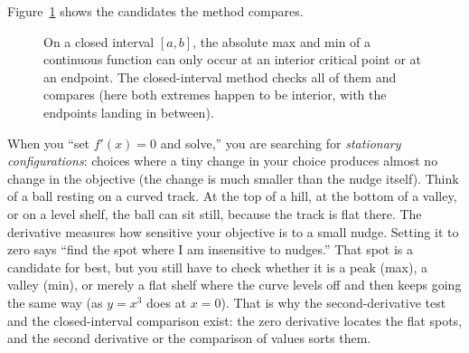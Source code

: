 Figure~\ref{ch17:fig-closed-interval} shows the candidates the method compares.

\begin{figure}[H]
\centering
{}
\caption{On a closed interval $[a,b]$, the absolute max and min of a continuous
function can only occur at an interior critical point or at an endpoint. The
closed-interval method checks all of them and compares (here both extremes happen to
be interior, with the endpoints landing in between).}
\label{ch17:fig-closed-interval}
\end{figure}

\begin{happeningbox}
When you ``set $f'(x)=0$ and solve,'' you are searching for \emph{stationary
configurations}: choices where a tiny change in your choice produces almost no change
in the objective (the change is much smaller than the nudge itself). Think of a ball
resting on a curved track. At the top of a hill, at the bottom of a valley, or on a
level shelf, the ball can sit still, because the track is flat there. The derivative
measures how sensitive your objective is to a small nudge. Setting it to zero says
``find the spot where I am insensitive to nudges.'' That spot is a candidate for
best, but you still have to check whether it is a peak (max), a valley (min), or
merely a flat shelf where the curve levels off and then keeps going the same way (as
$y=x^3$ does at $x=0$). That is why the second-derivative test and the
closed-interval comparison exist: the zero derivative locates the flat spots, and the
second derivative or the comparison of values sorts them.
\end{happeningbox}

